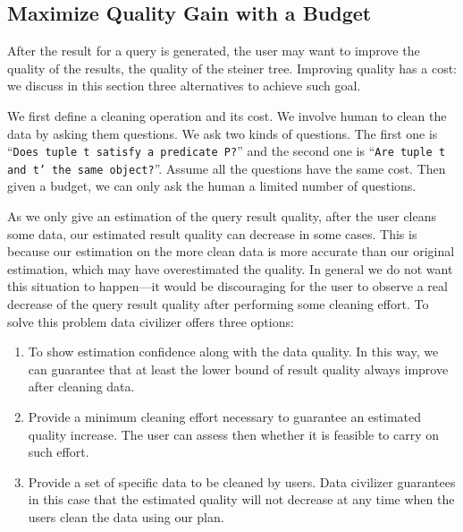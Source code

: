 \subsection{Maximize Quality Gain with a Budget}\label{subsec:gain}

After the result for a query is generated, the user may want to improve the
quality of the results, \ie the quality of the steiner tree. Improving quality
has a cost: we discuss in this section three alternatives to achieve such goal.

We first define a cleaning operation and its cost. We involve human to clean the
data by asking them questions. We ask two kinds of questions. The first one is
``\texttt{Does tuple t satisfy a predicate P?}'' and the second one is
``\texttt{Are tuple t and t' the same object?}''. Assume all the questions have
the same cost. Then given a budget, we can only ask the human a limited number
of questions.

As we only give an estimation of the query result quality, after the user cleans
some data, our estimated result quality can decrease in some cases. This is
because our estimation on the more clean data is more accurate than our original
estimation, which may have overestimated the quality. In general we do not want
this situation to happen---it would be discouraging for the user to observe a
real decrease of the query result quality after performing some cleaning effort.
To solve this problem data civilizer offers three options:

\begin{enumerate}
\item To show estimation confidence along with the data quality. In this
way, we can guarantee that at least the lower bound of result quality always
improve after cleaning data.

\item Provide a minimum cleaning effort necessary to guarantee an estimated
quality increase. The user can assess then whether it is feasible to carry on
such effort.

\item Provide a set of specific data to be cleaned by users. Data civilizer
guarantees in this case that the estimated quality will not decrease at any time
when the users clean the data using our plan.
\end{enumerate}

